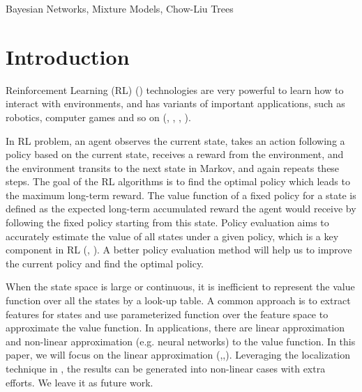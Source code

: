 \documentclass[twoside,11pt]{article}
\numberwithin{equation}{section}
\begin{document}
\begin{keywords}
  Bayesian Networks, Mixture Models, Chow-Liu Trees
\end{keywords}

\section{Introduction}

	Reinforcement Learning (RL) (\cite{sutton1998reinforcement}) technologies are very powerful to learn how to interact with environments, and has variants of important applications, such as robotics, computer games and so on (\cite{kober2013reinforcement}, \cite{mnih2015human}, \cite{silver2016mastering}, \cite{bahdanau2016actor}). 
	
	In RL problem, an agent observes the current state, takes an action following a policy based on the current state, receives a reward from the environment, and the environment transits to the next state in Markov, and again repeats these steps. The goal of  the RL algorithms is to find the optimal policy which leads to the maximum long-term reward. The value function of a fixed policy for a   state is defined as the expected long-term accumulated reward the agent would receive by following the fixed policy starting from this state. Policy evaluation aims to accurately estimate the value of all states under a given policy, which is a key component in RL (\cite{sutton1998reinforcement}, \cite{dann2014policy}). A better policy evaluation method will help us to improve the current policy and find the optimal policy.
	
	When the state space is large or continuous, it is inefficient to represent the value function over all the states by a look-up table. A common approach is to extract features for states and use parameterized function over the feature space to approximate the value function. In applications, there are linear approximation and non-linear approximation (e.g. neural networks) to the value function. In this paper, we will focus on the linear approximation (\cite{sutton2009convergent},\cite{sutton2009fast},\cite{liu2015finite}). Leveraging the localization technique in \cite{bhatnagar2009convergent}, the results can be generated into non-linear cases with extra efforts. We leave it as future work. 
	
\end{document}
